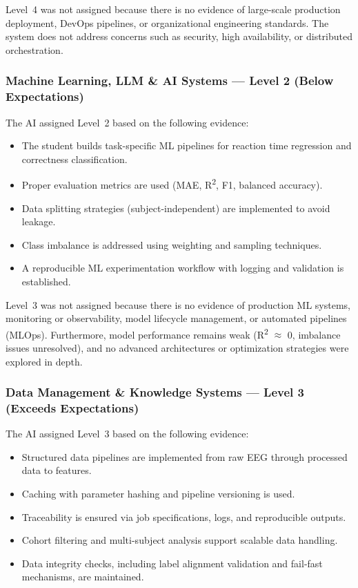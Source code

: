 Level~4 was not assigned because there is no evidence of large-scale production deployment,
DevOps pipelines, or organizational engineering standards. The system does not address
concerns such as security, high availability, or distributed orchestration.

\subsubsection{Machine Learning, LLM \& AI Systems — Level 2 (Below Expectations)}

The AI assigned Level~2 based on the following evidence:
\begin{itemize}
    \item The student builds task-specific ML pipelines for reaction time regression and correctness classification.
    \item Proper evaluation metrics are used (MAE, R\textsuperscript{2}, F1, balanced accuracy).
    \item Data splitting strategies (subject-independent) are implemented to avoid leakage.
    \item Class imbalance is addressed using weighting and sampling techniques.
    \item A reproducible ML experimentation workflow with logging and validation is established.
\end{itemize}

Level~3 was not assigned because there is no evidence of production ML systems,
monitoring or observability, model lifecycle management, or automated pipelines (MLOps).
Furthermore, model performance remains weak (R\textsuperscript{2} $\approx$ 0, imbalance
issues unresolved), and no advanced architectures or optimization strategies were explored in depth.

\subsubsection{Data Management \& Knowledge Systems — Level 3 (Exceeds Expectations)}

The AI assigned Level~3 based on the following evidence:
\begin{itemize}
    \item Structured data pipelines are implemented from raw EEG through processed data to features.
    \item Caching with parameter hashing and pipeline versioning is used.
    \item Traceability is ensured via job specifications, logs, and reproducible outputs.
    \item Cohort filtering and multi-subject analysis support scalable data handling.
    \item Data integrity checks, including label alignment validation and fail-fast mechanisms, are maintained.
\end{itemize}

